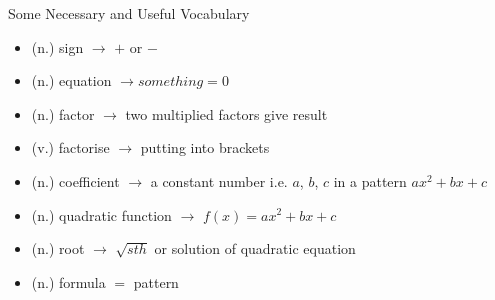 \documentclass[final]{beamer}
\newlength{\onecolwid}
\begin{document}
\begin{frame}[t]
\begin{columns}[t]
\begin{column}{\onecolwid}
                    
                    \begin{alertblock}{Some Necessary and Useful Vocabulary}
                    
                    \begin{itemize}
                    \item (n.) sign $\rightarrow$ $+$ or $-$
                    \item (n.) equation $\rightarrow something = 0$ 
                    \item (n.) factor $\rightarrow$ two multiplied factors give result
                    \item (v.) factorise $\rightarrow$ putting into brackets
                    \item (n.) coefficient $\rightarrow$ a constant number i.e. $a$, $b$, $c$ in a pattern $ax^2+bx+c$
                    \item (n.) quadratic function $\rightarrow$ $f(x) = ax^2+bx+c$
                    \item (n.) root $\rightarrow$ $\sqrt{sth}$ or solution of quadratic equation
                    \item (n.) formula $=$ pattern
                    \end{itemize}
                    
                    \end{alertblock}
                    
                    
                    
                    \end{column} %
                    
                    \end{columns} %
                    
                    \end{frame} %
                    
                    
\end{document}
